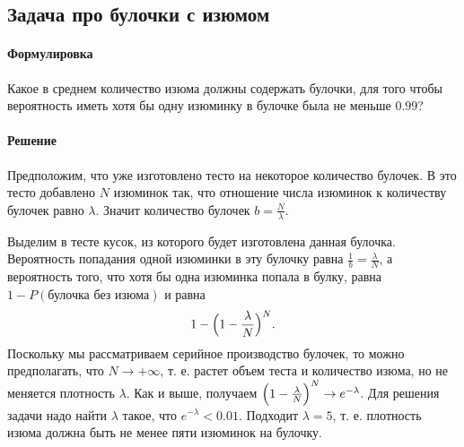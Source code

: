 \sectionbreak
\subsection{Задача про булочки с изюмом}

\paragraph*{Формулировка}
Какое в среднем количество изюма должны содержать булочки, для того чтобы
вероятность иметь хотя бы одну изюминку в булочке была не меньше $0.99$?

\paragraph*{Решение}
Предположим, что уже изготовлено тесто на некоторое количество булочек.
В это тесто добавлено $N$ изюминок так, что отношение числа изюминок к количеству булочек равно $\lambda$.
Значит количество булочек $b = \frac{N}{\lambda}$.

Выделим в тесте кусок, из которого будет изготовлена данная булочка.
Вероятность попадания одной изюминки в эту
булочку равна $\frac{1}{b} = \frac{\lambda}{N}$, а вероятность того, что хотя бы одна изюминка попала в булку, равна $1 - P(\text{булочка без изюма})$ и равна
\[
    1 - \Bigl( 1 - \frac{\lambda}{N} \Bigr)^{N}.
\]
Поскольку мы рассматриваем серийное производство булочек, то можно предполагать, что $N \to +\infty$, т. е. растет объем теста и количество изюма, но не меняется плотность $\lambda$.
Как и выше, получаем $\Bigl( 1 - \frac{\lambda}{N} \Bigr)^{N} \to e^{-\lambda}$.
Для решения задачи надо найти $\lambda$ такое, что $e^{-\lambda} < 0.01$.
Подходит $\lambda = 5$, т. е. плотность изюма должна быть не менее пяти изюминок на булочку.